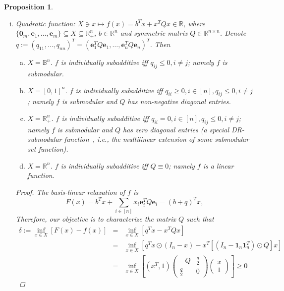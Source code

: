 \documentclass[11pt]{article}\usepackage[]{graphicx}\usepackage[]{xcolor}
\newtheorem{prop}{Proposition}
\begin{document}
\begin{prop}
\begin{enumerate}[(i)]
Note that when $X=\mathbb{B}^m$, then $(x, Y)$-subadditive is just subadditive for set functions. However, for $X=\mathbb{R}^m_{+}$, then $(x, Y)$-subadditive is not subadditive (which does not require positive homogeneity) for regular functions, but equivalent to sublinear for any vector space $X$ because any two properties among subadditivity, convexity, and positive homogeneity implies the other other.


\item Quadratic function: $X\ni x\mapsto f(x)=b^Tx+x^TQx\in\mathbb{R}$, where $\{\mathbf{0}_m, \mathbf{e}_1,\dots, \mathbf{e}_m\}\subseteq X\subseteq \mathbb{R}^n_{+}$, $b\in\mathbb{R}^n$ and symmetric matrix $Q\in\mathbb{R}^{n\times n}$. Denote $q:=(q_{11},\dots, q_{nn})^T=(\mathbf{e}_1^TQ\mathbf{e}_1,\dots, \mathbf{e}_n^TQ\mathbf{e}_n)^T$. Then 
\begin{enumerate}[(a)]
 \item $X=\mathbb{B}^n$. $f$ is individually subadditive iff $q_{ij}\le 0, i\ne j$; namely $f$ is submodular.
\item $X=[0,1]^n$. $f$ is individually subadditive iff $q_{ii}\ge 0, i\in [n], q_{ij}\le 0, i\ne j$; namely $f$ is submodular and $Q$ has non-negative diagonal entries.
\item $X=\mathbb{R}^n_{+}$. $f$ is individually subadditive iff $q_{ii}=0, i\in [n], q_{ij}\le 0, i\ne j$; namely $f$ is submodular and $Q$ has zero diagonal entries (a special DR-submodular function~\citep{marinacci2005ultramodular,bian2017continuous}, i.e., the multilinear extension of some submodular set function).
\item $X=\mathbb{R}^n$. $f$ is individually subadditive iff $Q\equiv 0$; namely $f$ is a linear function.
\end{enumerate}
\begin{proof} The basis-linear relaxation of $f$ is
\[
F(x)=b^Tx+\sum_{i\in [n]}x_i\mathbf{e}_i^TQ\mathbf{e}_i=(b+q)^Tx,
\]
 Therefore, our objective is to characterize the matrix $Q$ such that
\begin{eqnarray*}
\delta:=\inf_{x\in X}[F(x)-f(x)]&=&\inf_{x\in X}\left[q^Tx-x^TQx\right]\\
&=&\inf_{x\in X}\left[q^Tx\odot (I_n-x)-x^T\left[\left(I_n-\mathbf{1}_n\mathbf{1}_n^T\right)\odot Q\right]x\right]\\
&=&\inf_{x\in X} \left[(x^T, 1)\begin{pmatrix}
-Q&\frac{q}{2}\\
\frac{q}{2}&0
\end{pmatrix}\begin{pmatrix}x\\ 1\end{pmatrix}\right]\ge 0
\end{eqnarray*}


\end{proof}
\end{enumerate}
\end{prop}
\end{document}
